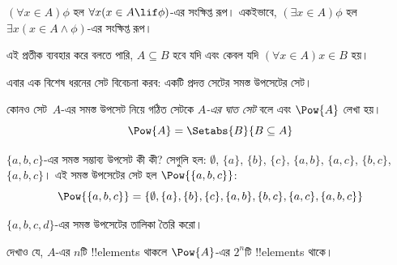 \documentclass[../../../include/open-logic-section]{subfiles}
\begin{document}
\begin{defn}
$(\forall x \in A)\phi$ হল $\forall x(x \in A \lif
\phi)$-এর সংক্ষিপ্ত রূপ। একইভাবে, $(\exists x \in A)\phi$ হল
$\exists x(x \in A \land \phi)$-এর সংক্ষিপ্ত রূপ।
\end{defn}

এই প্রতীক ব্যবহার করে বলতে পারি, $A \subseteq B$ হবে যদি এবং কেবল যদি
$(\forall x \in A)x \in B$ হয়।

এবার এক বিশেষ ধরনের সেট বিবেচনা করব: একটি প্রদত্ত সেটের সমস্ত উপসেটের সেট।

\begin{defn}[ঘাত সেট]
কোনও সেট~$A$-এর সমস্ত উপসেট নিয়ে গঠিত সেটকে
\emph{$A$-এর ঘাত সেট} বলে এবং $\Pow{A}$ লেখা হয়।
  \[
    \Pow{A} = \Setabs{B}{B \subseteq A}
  \]
\end{defn}

\begin{ex}
$\{ a, b, c \}$-এর সমস্ত সম্ভাব্য উপসেট কী কী? সেগুলি হল:
$\emptyset$, $\{a \}$, $\{b\}$, $\{c\}$, $\{a, b\}$, $\{a, c\}$,
$\{b, c\}$, $\{a, b, c\}$। এই সমস্ত উপসেটের সেট হল
$\Pow{\{a,b,c\}}$:
\[
\Pow{\{ a, b, c \}} = \{\emptyset, \{a \}, \{b\}, \{c\}, \{a, b\},
\{b, c\}, \{a, c\}, \{a, b, c\}\}
\]
\end{ex}

\begin{prob}
$\{a, b, c, d\}$-এর সমস্ত উপসেটের তালিকা তৈরি করো।
\end{prob}

\begin{prob}
দেখাও যে, $A$-এর $n$টি !!{element}s থাকলে $\Pow{A}$-এর
$2^n$টি !!{element}s থাকে।
\end{prob}
\end{document}
